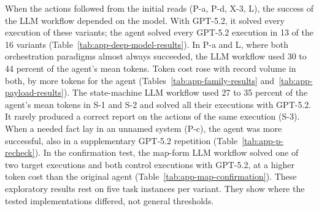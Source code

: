 When the actions followed from the initial reads (P-a, P-d, X-3, L), the success of the LLM workflow depended on the model. With GPT-5.2, it solved every execution of these variants; the agent solved every GPT-5.2 execution in 13 of the 16 variants (Table~\ref{tab:app-deep-model-results}). In P-a and L, where both orchestration paradigms almost always succeeded, the LLM workflow used 30 to 44 percent of the agent's mean tokens. Token cost rose with record volume in both, by more tokens for the agent (Tables~\ref{tab:app-family-results} and~\ref{tab:app-payload-results}). The state-machine LLM workflow used 27 to 35 percent of the agent's mean tokens in S-1 and S-2 and solved all their executions with GPT-5.2. It rarely produced a correct report on the actions of the same execution (S-3). When a needed fact lay in an unnamed system (P-c), the agent was more successful, also in a supplementary GPT-5.2 repetition (Table~\ref{tab:app-p-recheck}). In the confirmation test, the map-form LLM workflow solved one of two target executions and both control executions with GPT-5.2, at a higher token cost than the original agent (Table~\ref{tab:app-map-confirmation}). These exploratory results rest on five task instances per variant. They show where the tested implementations differed, not general thresholds.

